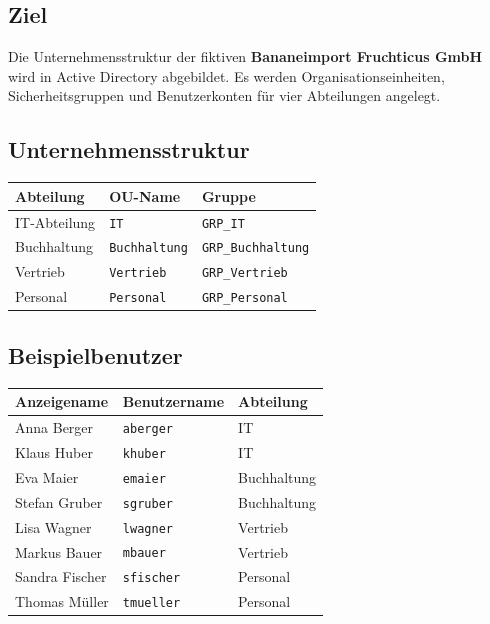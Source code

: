 \documentclass[11pt, oneside, numbers=noenddot]{scrbook}
\begin{document}
\subsection*{Ziel}
Die Unternehmensstruktur der fiktiven \textbf{Bananeimport Fruchticus GmbH} wird in Active Directory abgebildet. Es werden Organisationseinheiten, Sicherheitsgruppen und Benutzerkonten für vier Abteilungen angelegt.

\subsection*{Unternehmensstruktur}

\begin{center}
\begin{tabular}{|l|l|l|}
\hline
\textbf{Abteilung} & \textbf{OU-Name} & \textbf{Gruppe} \\
\hline
IT-Abteilung & \texttt{IT} & \texttt{GRP\_IT} \\
Buchhaltung & \texttt{Buchhaltung} & \texttt{GRP\_Buchhaltung} \\
Vertrieb & \texttt{Vertrieb} & \texttt{GRP\_Vertrieb} \\
Personal & \texttt{Personal} & \texttt{GRP\_Personal} \\
\hline
\end{tabular}
\end{center}

\subsection*{Beispielbenutzer}

\begin{center}
\begin{tabular}{|l|l|l|}
\hline
\textbf{Anzeigename} & \textbf{Benutzername} & \textbf{Abteilung} \\
\hline
Anna Berger & \texttt{aberger} & IT \\
Klaus Huber & \texttt{khuber} & IT \\
Eva Maier & \texttt{emaier} & Buchhaltung \\
Stefan Gruber & \texttt{sgruber} & Buchhaltung \\
Lisa Wagner & \texttt{lwagner} & Vertrieb \\
Markus Bauer & \texttt{mbauer} & Vertrieb \\
Sandra Fischer & \texttt{sfischer} & Personal \\
Thomas Müller & \texttt{tmueller} & Personal \\
\hline
\end{tabular}
\end{center}
 \newpage
\end{document}
